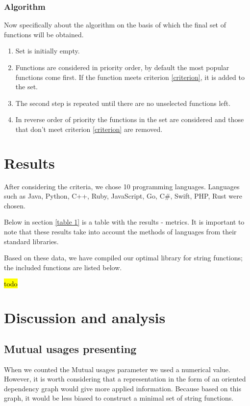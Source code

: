 \documentclass[anonymous,sigplan,review,11pt,nonacm,natbib=false]{acmart}
\begin{document}
    \subsubsection{Algorithm}

    Now specifically about the algorithm on the basis of which the final set of functions will be obtained.

    \begin{enumerate}
        \item Set is initially empty.
        \item Functions are considered in priority order, by default the most popular functions come first. If the function meets criterion \ref{criterion}, it is added to the set.
        \item The second step is repeated until there are no unselected functions left.
        \item In reverse order of priority the functions in the set are considered and those that don't meet criterion \ref{criterion} are removed.
    \end{enumerate}

    \section{Results}

    After considering the criteria, we chose 10 programming languages. Languages such as Java, Python, C++, Ruby, JavaScript, Go, C\#, Swift, PHP, Rust were chosen.

    Below in section \ref{table 1} is a table with the results - metrics. It is important to note that these results take into account the methods of languages from their standard libraries.

    Based on these data, we have compiled our optimal library for string functions; the included functions are listed below.

    \hl{todo}

    \section{Discussion and analysis}

    \subsection{Mutual usages presenting}

    When we counted the Mutual usages parameter we used a numerical value. However, it is worth considering that a representation in the form of an oriented dependency graph would give more applied information. Because based on this graph, it would be less biased to construct a minimal set of string functions.
\end{document}
